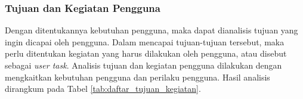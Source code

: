 \subsubsection{Tujuan dan Kegiatan Pengguna}
\label{subsubsec:tujuan_kegiatan_pengguna}

Dengan ditentukannya kebutuhan pengguna, maka dapat dianalisis tujuan yang ingin dicapai oleh pengguna. Dalam mencapai tujuan-tujuan tersebut, maka perlu ditentukan kegiatan yang harus dilakukan oleh pengguna, atau disebut sebagai \textit{user task}. Analisis tujuan dan kegiatan pengguna dilakukan dengan mengkaitkan kebutuhan pengguna dan perilaku pengguna. Hasil analisis dirangkum pada Tabel \ref{tab:daftar_tujuan_kegiatan}.


\newlength{\cccolid}
\setlength{\cccolid}{0.08\textwidth}

\newlength{\cccolgoal}
\setlength{\cccolgoal}{0.2\textwidth}

\newlength{\cccolneed}
\setlength{\cccolneed}{0.13\textwidth}

\newcommand{\ccid}[2]{\multirow{#1}{\cccolid}{\centering\linespread{1}\selectfont #2}}
\newcommand{\ccgoal}[2]{\multirow{#1}{\cccolgoal}{\linespread{1}\selectfont #2}}
\newcommand{\ccneed}[2]{\multirow{#1}{\cccolneed}{\centering\linespread{1}\selectfont #2}}
\newcommand{\ccline}{\hhline{|~|~|-|-|~|}}



